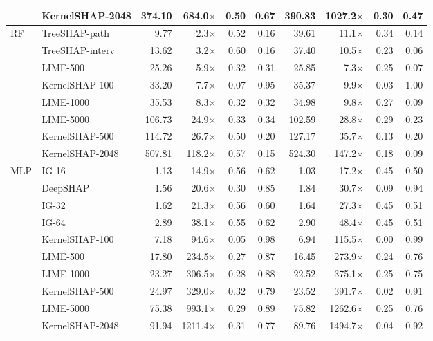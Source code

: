 \begin{table}[!htbp]
\begin{tabular}{llrrrr@{\hspace{10pt}}rrrr}
 & KernelSHAP-2048 & 374.10 & 684.0$\times$ & 0.50 & 0.67 & 390.83 & 1027.2$\times$ & 0.30 & 0.47 \\
\midrule
RF & TreeSHAP-path & 9.77 & 2.3$\times$ & 0.52 & 0.16 & 39.61 & 11.1$\times$ & 0.34 & 0.14 \\
 & TreeSHAP-interv & 13.62 & 3.2$\times$ & 0.60 & 0.16 & 37.40 & 10.5$\times$ & 0.23 & 0.06 \\
 & LIME-500 & 25.26 & 5.9$\times$ & 0.32 & 0.31 & 25.85 & 7.3$\times$ & 0.25 & 0.07 \\
 & KernelSHAP-100 & 33.20 & 7.7$\times$ & 0.07 & 0.95 & 35.37 & 9.9$\times$ & 0.03 & 1.00 \\
 & LIME-1000 & 35.53 & 8.3$\times$ & 0.32 & 0.32 & 34.98 & 9.8$\times$ & 0.27 & 0.09 \\
 & LIME-5000 & 106.73 & 24.9$\times$ & 0.33 & 0.34 & 102.59 & 28.8$\times$ & 0.29 & 0.23 \\
 & KernelSHAP-500 & 114.72 & 26.7$\times$ & 0.50 & 0.20 & 127.17 & 35.7$\times$ & 0.13 & 0.20 \\
 & KernelSHAP-2048 & 507.81 & 118.2$\times$ & 0.57 & 0.15 & 524.30 & 147.2$\times$ & 0.18 & 0.09 \\
\midrule
MLP & IG-16 & 1.13 & 14.9$\times$ & 0.56 & 0.62 & 1.03 & 17.2$\times$ & 0.45 & 0.50 \\
 & DeepSHAP & 1.56 & 20.6$\times$ & 0.30 & 0.85 & 1.84 & 30.7$\times$ & 0.09 & 0.94 \\
 & IG-32 & 1.62 & 21.3$\times$ & 0.56 & 0.60 & 1.64 & 27.3$\times$ & 0.45 & 0.51 \\
 & IG-64 & 2.89 & 38.1$\times$ & 0.55 & 0.62 & 2.90 & 48.4$\times$ & 0.45 & 0.51 \\
 & KernelSHAP-100 & 7.18 & 94.6$\times$ & 0.05 & 0.98 & 6.94 & 115.5$\times$ & 0.00 & 0.99 \\
 & LIME-500 & 17.80 & 234.5$\times$ & 0.27 & 0.87 & 16.45 & 273.9$\times$ & 0.24 & 0.76 \\
 & LIME-1000 & 23.27 & 306.5$\times$ & 0.28 & 0.88 & 22.52 & 375.1$\times$ & 0.25 & 0.75 \\
 & KernelSHAP-500 & 24.97 & 329.0$\times$ & 0.32 & 0.79 & 23.52 & 391.7$\times$ & 0.02 & 0.91 \\
 & LIME-5000 & 75.38 & 993.1$\times$ & 0.29 & 0.89 & 75.82 & 1262.6$\times$ & 0.25 & 0.76 \\
 & KernelSHAP-2048 & 91.94 & 1211.4$\times$ & 0.31 & 0.77 & 89.76 & 1494.7$\times$ & 0.04 & 0.92 \\
\bottomrule
\end{tabular}
\end{table}
